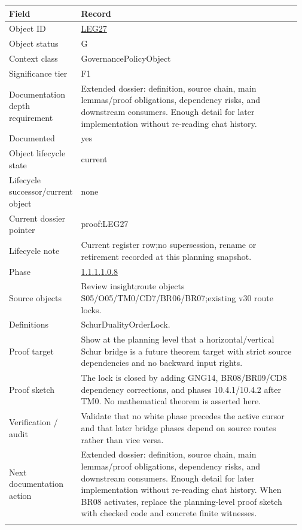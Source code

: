 \begin{longtable}{L{0.16\linewidth} L{0.81\linewidth}}
\hline
\textbf{Field} & \textbf{Record}\\
\hline
Object ID & \hyperlink{object-row-LEG27}{LEG27}\\
\hline\addlinespace[0.20em]
Object status & G\\
\hline\addlinespace[0.20em]
Context class & GovernancePolicyObject\\
\hline\addlinespace[0.20em]
Significance tier & F1\\
\hline\addlinespace[0.20em]
Documentation depth requirement & Extended dossier: definition, source chain, main lemmas/\allowbreak{}proof obligations, dependency risks, and downstream consumers. Enough detail for later implementation without re-reading chat history.\\
\hline\addlinespace[0.20em]
Documented & yes\\
\hline\addlinespace[0.20em]
Object lifecycle state & current\\
\hline\addlinespace[0.20em]
Lifecycle successor/\allowbreak{}current object & none\\
\hline\addlinespace[0.20em]
Current dossier pointer & proof:LEG27\\
\hline\addlinespace[0.20em]
Lifecycle note & Current register row;\newline no supersession, rename or retirement recorded at this planning snapshot.\\
\hline\addlinespace[0.20em]
Phase & \hyperlink{phase-row-1-1-1-1-0-8}{1.1.1.1.0.8}\\
\hline\addlinespace[0.20em]
Source objects & Review insight;\newline route objects S05/\allowbreak{}O05/\allowbreak{}TM0/\allowbreak{}CD7/\allowbreak{}BR06/\allowbreak{}BR07;\newline existing v30 route locks.\\
\hline\addlinespace[0.20em]
Definitions & SchurDualityOrderLock.\\
\hline\addlinespace[0.20em]
Proof target & Show at the planning level that a horizontal/\allowbreak{}vertical Schur bridge is a future theorem target with strict source dependencies and no backward input rights.\\
\hline\addlinespace[0.20em]
Proof sketch & The lock is closed by adding GNG14, BR08/\allowbreak{}BR09/\allowbreak{}CD8 dependency corrections, and phases 10.4.1/\allowbreak{}10.4.2 after TM0. No mathematical theorem is asserted here.\\
\hline\addlinespace[0.20em]
Verification /\allowbreak{} audit & Validate that no white phase precedes the active cursor and that later bridge phases depend on source routes rather than vice versa.\\
\hline\addlinespace[0.20em]
Next documentation action & Extended dossier: definition, source chain, main lemmas/\allowbreak{}proof obligations, dependency risks, and downstream consumers. Enough detail for later implementation without re-reading chat history. When BR08 activates, replace the planning-level proof sketch with checked code and concrete finite witnesses.\\
\hline\addlinespace[0.20em]
\end{longtable}
